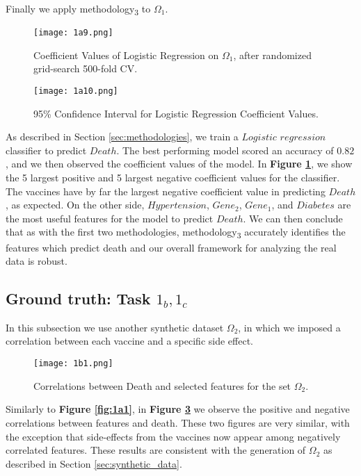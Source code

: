Finally we apply methodology\textsubscript{3} to $\Omega_1$. 

\begin{figure}[H]
  \texttt{[image: 1a9.png]}
  \caption{Coefficient Values of Logistic Regression on $\Omega_1$, after randomized grid-search 500-fold CV.}
  \label{fig:1a9}
\end{figure}

\begin{figure}[H]
  \texttt{[image: 1a10.png]}
  \caption{95\% Confidence Interval for Logistic Regression Coefficient Values.}
  \label{fig:1a10}
\end{figure}

As described in Section \ref{sec:methodologies}, we train a $Logistic$ $regression$ classifier to predict $Death$. The best performing model scored an accuracy of $0.82$, and we then observed the coefficient values of the model. In \textbf{Figure \ref{fig:1a9}}, we show the 5 largest positive and 5 largest negative coefficient values for the classifier. The vaccines have by far the largest negative coefficient value in predicting $Death$, as expected. On the other side, $Hypertension$, $Gene_2$, $Gene_1$, and $Diabetes$ are the most useful features for the model to predict $Death$. We can then conclude that as with the first two methodologies, methodology\textsubscript{3} accurately identifies the features which predict death and our overall framework for analyzing the real data is robust.

\subsection{Ground truth: Task $1_b, 1_c$}
\graphicspath{{pictures/task1b/}}
In this subsection we use another synthetic dataset $\Omega_2$, in which we imposed a correlation between each vaccine and a specific side effect.

\begin{figure}[H]
  \texttt{[image: 1b1.png]}
  \caption{Correlations between Death and selected features for the set $\Omega_2$.}
    \label{fig:1b1}
\end{figure}

Similarly to \textbf{Figure \ref{fig:1a1}}, in \textbf{Figure \ref{fig:1b1}} we observe the positive and negative correlations between features and death. These two figures are very similar, with the exception that side-effects from the vaccines now appear among negatively correlated features. These results are consistent with the generation of $\Omega_2$ as described in Section \ref{sec:synthetic_data}.

